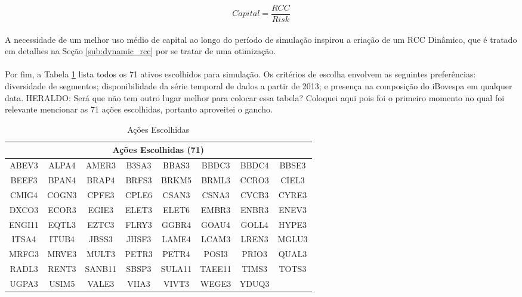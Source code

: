 \begin{equation} \label{eq:61}
    Capital = \dfrac{RCC}{Risk}
\end{equation}

\paragraph{} A necessidade de um melhor uso médio de capital ao longo do período de simulação inspirou a criação de um RCC Dinâmico, que é tratado em detalhes na Seção \ref{sub:dynamic_rcc} por se tratar de uma otimização.

\paragraph{} Por fim, a Tabela \ref{tab:5} lista todos os 71 ativos escolhidos para simulação. Os critérios de escolha envolvem as seguintes preferências: diversidade de segmentos; disponibilidade da série temporal de dados a partir de 2013; e presença na composição do iBovespa em qualquer data. \color{red} HERALDO: Será que não tem outro lugar melhor para colocar essa tabela? Coloquei aqui pois foi o primeiro momento no qual foi relevante mencionar as 71 ações escolhidas, portanto aproveitei o gancho. 

\begin{table}[h!]
    \begin{center}
        \begin{tabular}{ cccccccc }
            \multicolumn{8}{c}{Ações Escolhidas (71)} \\
            \hline
            ABEV3 & ALPA4 & AMER3 & B3SA3 & BBAS3 & BBDC3 & BBDC4 & BBSE3 \\
            BEEF3 & BPAN4 & BRAP4 & BRFS3 & BRKM5 & BRML3 & CCRO3 & CIEL3 \\
            CMIG4 & COGN3 & CPFE3 & CPLE6 & CSAN3 & CSNA3 & CVCB3 & CYRE3 \\
            DXCO3 & ECOR3 & EGIE3 & ELET3 & ELET6 & EMBR3 & ENBR3 & ENEV3 \\
            ENGI11 & EQTL3 & EZTC3 & FLRY3 & GGBR4 & GOAU4 & GOLL4 & HYPE3 \\
            ITSA4 & ITUB4 & JBSS3 & JHSF3 & LAME4 & LCAM3 & LREN3 & MGLU3 \\
            MRFG3 & MRVE3 & MULT3 & PETR3 & PETR4 & POSI3 & PRIO3 & QUAL3 \\
            RADL3 & RENT3 & SANB11 & SBSP3 & SULA11 & TAEE11 & TIMS3 & TOTS3 \\
            UGPA3 & USIM5 & VALE3 & VIIA3 & VIVT3 & WEGE3 & YDUQ3
        \end{tabular}
        \caption{Ações Escolhidas}
        \label{tab:5}
    \end{center}
\end{table}



